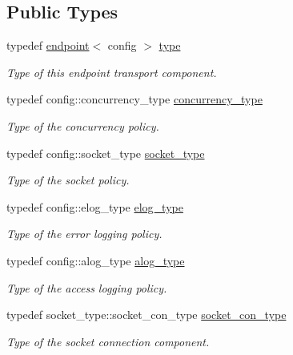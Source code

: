\subsection*{Public Types}
\begin{DoxyCompactItemize}
\item 
typedef \hyperlink{classwebsocketpp_1_1transport_1_1asio_1_1endpoint}{endpoint}$<$ config $>$ \hyperlink{classwebsocketpp_1_1transport_1_1asio_1_1endpoint_a86283417bb35f13b9a1d9795f5fcf077}{type}
\begin{DoxyCompactList}\small\item\em Type of this endpoint transport component. \end{DoxyCompactList}\item 
typedef config\+::concurrency\+\_\+type \hyperlink{classwebsocketpp_1_1transport_1_1asio_1_1endpoint_aa1979c2199a48526d5bc44651ffc72f3}{concurrency\+\_\+type}
\begin{DoxyCompactList}\small\item\em Type of the concurrency policy. \end{DoxyCompactList}\item 
typedef config\+::socket\+\_\+type \hyperlink{classwebsocketpp_1_1transport_1_1asio_1_1endpoint_a13784d09af030a55e85faaf8f111fdc3}{socket\+\_\+type}
\begin{DoxyCompactList}\small\item\em Type of the socket policy. \end{DoxyCompactList}\item 
typedef config\+::elog\+\_\+type \hyperlink{classwebsocketpp_1_1transport_1_1asio_1_1endpoint_a2aa93730c801602b55b585121a2898c0}{elog\+\_\+type}
\begin{DoxyCompactList}\small\item\em Type of the error logging policy. \end{DoxyCompactList}\item 
typedef config\+::alog\+\_\+type \hyperlink{classwebsocketpp_1_1transport_1_1asio_1_1endpoint_acba708e66a47d4aae9a053d364585b81}{alog\+\_\+type}
\begin{DoxyCompactList}\small\item\em Type of the access logging policy. \end{DoxyCompactList}\item 
typedef socket\+\_\+type\+::socket\+\_\+con\+\_\+type \hyperlink{classwebsocketpp_1_1transport_1_1asio_1_1endpoint_a0b6f8cbdf8f2141915881a6d13779545}{socket\+\_\+con\+\_\+type}
\begin{DoxyCompactList}\small\item\em Type of the socket connection component. \end{DoxyCompactList}\item 

\end{DoxyCompactItemize}
